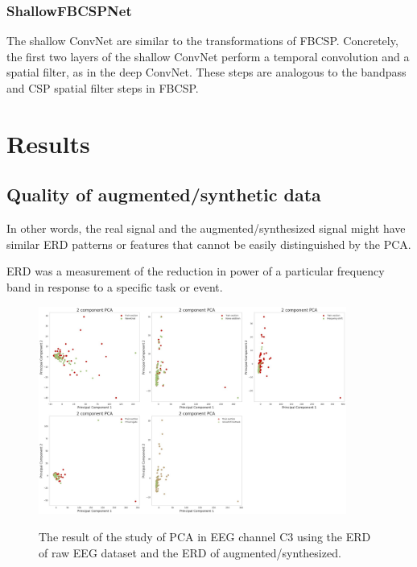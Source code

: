 \documentclass[runningheads]{llncs}
\begin{document}
\subsubsection{ShallowFBCSPNet}
The shallow ConvNet are similar to the transformations of FBCSP. Concretely, the first two layers of the shallow ConvNet perform a temporal convolution and a spatial filter, as in the deep ConvNet. These steps are analogous to the bandpass and CSP spatial filter steps in FBCSP.

\section{Results}

\subsection{Quality of augmented/synthetic data}




In other words, the real signal and the augmented/synthesized signal might have similar ERD patterns or features that cannot be easily distinguished by the PCA. 

ERD was a measurement of the reduction in power of a particular frequency band in response to a specific task or event. 

\begin{figure}[ht]
  \centering
  \caption[The result of PCA ]{The result of the study of PCA in EEG channel C3 using the ERD of raw EEG dataset and the ERD of augmented/synthesized.
}
  \includegraphics[width=0.9\textwidth]{fig/PCA.jpg}
  \label{fig:PCA}
\end{figure}
\end{document}
